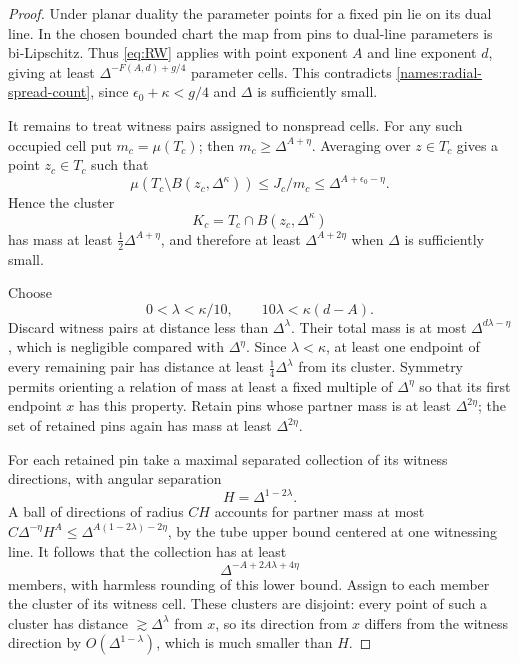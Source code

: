 \begin{proof}
Under planar duality the parameter points for a fixed pin lie on
its dual line.  In the chosen bounded chart the map from pins to
dual-line parameters is bi-Lipschitz.  Thus \eqref{eq:RW} applies
with point exponent $A$ and line exponent $d$, giving at least
$\Delta^{-F(A,d)+g/4}$ parameter cells.  This contradicts
\eqref{names:radial-spread-count}, since
$\epsilon_0+\kappa<g/4$ and $\Delta$ is sufficiently small.

It remains to treat witness pairs assigned to nonspread cells.
For any such occupied cell put $m_c=\mu(T_c)$; then
$m_c\geq\Delta^{A+\eta}$.  Averaging over $z\in T_c$ gives
a point $z_c\in T_c$ such that
\[
 \mu(T_c\setminus B(z_c,\Delta^\kappa))
       \leq J_c/m_c
       \leq\Delta^{A+\epsilon_0-\eta}.
\]
Hence the cluster
\[
 K_c=T_c\cap B(z_c,\Delta^\kappa)
\]
has mass at least $\tfrac12\Delta^{A+\eta}$, and therefore
at least $\Delta^{A+2\eta}$ when $\Delta$ is sufficiently small.

Choose
\[
 0<\lambda<\kappa/10,
 \qquad 10\lambda<\kappa(d-A).
\]
Discard witness pairs at distance less than $\Delta^\lambda$.
Their total mass is at most $\Delta^{d\lambda-\eta}$, which
is negligible compared with $\Delta^\eta$.  Since
$\lambda<\kappa$, at least one endpoint of every remaining pair
has distance at least $\tfrac14\Delta^\lambda$ from its
cluster.  Symmetry permits orienting a relation of mass at least
a fixed multiple of $\Delta^\eta$ so that its first endpoint
$x$ has this property.  Retain pins whose partner mass is at
least $\Delta^{2\eta}$; the set of retained pins again has
mass at least $\Delta^{2\eta}$.

For each retained pin take a maximal separated collection of its
witness directions, with angular separation
\[
 H=\Delta^{1-2\lambda}.
\]
A ball of directions of radius $CH$ accounts for partner mass
at most
$C\Delta^{-\eta}H^A\leq\Delta^{A(1-2\lambda)-2\eta}$,
by the tube upper bound centered at one witnessing line.
It follows that the collection has at least
\begin{equation}\label{names:radial-number-clusters}
 \Delta^{-A+2A\lambda+4\eta}
\end{equation}
members, with harmless rounding of this lower bound.  Assign to
each member the cluster of its witness cell.  These clusters are
disjoint: every point of such a cluster has distance
$\gtrsim\Delta^\lambda$ from $x$, so its direction from $x$
differs from the witness direction by $O(\Delta^{1-\lambda})$,
which is much smaller than $H$.


\end{proof}
